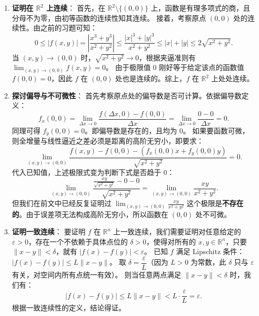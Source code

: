 \documentclass[lang=cn,11pt]{elegantbook}
\begin{document}
\begin{solution}
\begin{enumerate}
  \item[(1)] \textbf{证明在 $\mathbb{R}^2$ 上连续}：
  首先，在 $\mathbb{R}^2 \setminus \{(0,0)\}$ 上，函数是有理多项式的商，且分母不为零，由初等函数的连续性知其连续。
  接着，考察原点 $(0,0)$ 处的连续性。由之前的习题可知：
  \[
  0 \leqslant  |f(x,y)| = \left| \frac{x^3+y^3}{x^2+y^2} \right| \leqslant  \frac{|x|^3+|y|^3}{x^2+y^2} \leqslant  |x| + |y| \leqslant  2\sqrt{x^2+y^2}.
  \]
  当 $(x,y)\to(0,0)$ 时，$\sqrt{x^2+y^2} \to 0$，根据夹逼准则有 $\displaystyle\lim_{(x,y)\to(0,0)}f(x,y) = 0$。
  由于极限值 $0$ 刚好等于给定该点的函数值 $f(0,0)=0$，因此 $f$ 在 $(0,0)$ 处也是连续的。综上，$f$ 在 $\mathbb{R}^2$ 上处处连续。

  \item[(2)] \textbf{探讨偏导与不可微性}：
  首先考察原点处的偏导数是否可计算。依据偏导数定义：
  \[
  f_x(0,0) = \lim_{\Delta x \to 0} \frac{f(\Delta x, 0) - f(0,0)}{\Delta x} = \lim_{\Delta x \to 0} \frac{0 - 0}{\Delta x} = 0.
  \]
  同理可得 $f_y(0,0) = 0$。即偏导数是存在的，且均为 0。
  如果要函数可微，则全增量与线性逼近之差必须是距离的高阶无穷小，即要求：
  \[
  \lim_{(x,y)\to(0,0)} \frac{f(x,y) - f(0,0) - (f_x(0,0)x + f_y(0,0)y)}{\sqrt{x^2+y^2}} = 0.
  \]
  代入已知值，上述极限式变为判断下式是否趋于 0：
  \[
  \lim_{(x,y)\to(0,0)} \frac{\frac{xy}{\sqrt{x^2+y^2}} - 0 - 0}{\sqrt{x^2+y^2}} = \lim_{(x,y)\to(0,0)} \frac{xy}{x^2+y^2}.
  \]
  但我们在前文中已经反复证明过 $\displaystyle\lim_{(x,y)\to(0,0)} \frac{xy}{x^2+y^2}$ 这个极限是\textbf{不存在的}。由于误差项无法构成高阶无穷小，所以函数在 $(0,0)$ 处不可微。

  \item[(3)] \textbf{证明一致连续}：
  要证明 $f$ 在 $\mathbb{R}^n$ 上一致连续，我们需要证明对任意给定的 $\varepsilon>0$，存在一个不依赖于具体点位的 $\delta>0$，使得对所有的 $x,y \in \mathbb{R}^n$，只要 $\|x-y\|<\delta$，就有 $|f(x)-f(y)|<\varepsilon$。
  已知 $f$ 满足 Lipschitz 条件：$|f(x)-f(y)|\leqslant  L\|x-y\|$。
  取 $\delta = \dfrac{\varepsilon}{L}$（因为 $L>0$ 为常数，此 $\delta$ 只与 $\varepsilon$ 有关，对空间内所有点统一有效）。
  则当任意两点满足 $\|x-y\|<\delta$ 时，我们有：
  \[
  |f(x)-f(y)| \leqslant  L\|x-y\| < L \cdot \frac{\varepsilon}{L} = \varepsilon.
  \]
  根据一致连续性的定义，结论得证。
\end{enumerate}
\end{solution}
\end{document}
